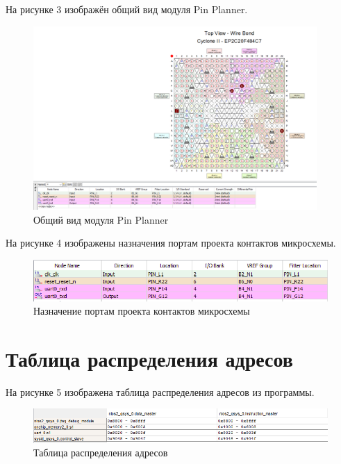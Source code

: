 На рисунке 3 изображён общий вид модуля Pin Planner. 

\FloatBarrier
\begin{figure}[]
	\begin{center}
		\includegraphics[width=\linewidth, height=7cm]{inc/pinplan.png}
	\end{center}
	\caption{Общий вид модуля Pin Planner}
\end{figure}
\FloatBarrier

На рисунке 4 изображены назначения портам проекта контактов микросхемы.

\FloatBarrier
\begin{figure}[h]
	\begin{center}
		\includegraphics[width=\linewidth]{inc/pins.png}
	\end{center}
	\caption{Назначение портам проекта контактов микросхемы}
\end{figure}
\FloatBarrier

\section*{Таблица распределения адресов}
На рисунке 5 изображена таблица распределения адресов из программы.
\FloatBarrier
\begin{figure}[]
	\begin{center}
		\includegraphics[width=\linewidth]{inc/map.png}
	\end{center}
	\caption{Таблица распределения адресов}
\end{figure}
\FloatBarrier
